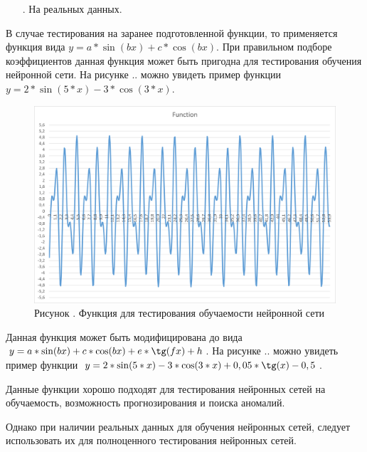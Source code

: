 {\begin{itemize}[leftmargin=2.15cm, labelwidth=0.65cm, labelsep=0.0cm]
		\item[\theitemcntr. ] На реальных данных.
		\addtocounter{itemcntr}{1}
		
		\setcounter{itemcntr}{1}
	\end{itemize}  
	
	\par \redline В случае тестирования на заранее подготовленной функции, то применяется функция вида $y = a * \sin (bx) + c * \cos (bx)$. При правильном подборе коэффициентов данная функция может быть пригодна для тестирования обучения нейронной сети. На рисунке \thechaptercntr.\theimagecntr. \spc можно увидеть пример функции $y=2*\sin(5*x) - 3 * \cos(3*x)$. 
	
	\begin{figure}
		\centering
		\def\svgwidth{\textwidth}
		\includegraphics[scale=0.8]{images/graphic1.png}
		\caption*{\gostFont Рисунок \thechaptercntr .\theimagecntr \spc {--} Функция для тестирования обучаемости нейронной сети}
	\end{figure}  \addtocounter{imagecntr}{1}
	
	\par \redline Данная функция может быть модифицирована до вида $y = a * \sin (bx) + c * \cos (bx) + e * \tg(fx) + h $. На рисунке \thechaptercntr.\theimagecntr. \spc можно увидеть пример функции $y=2*\sin(5*x) - 3 * \cos(3*x) + 0,05 * \tg(x) - 0,5$. 
	
	\par \redline Данные функции хорошо подходят для тестирования нейронных сетей на обучаемость, возможность прогнозирования и поиска аномалий.
	
	\par \redline Однако при наличии реальных данных для обучения нейронных сетей, следует использовать их для полноценного тестирования нейронных сетей.  
	
}
